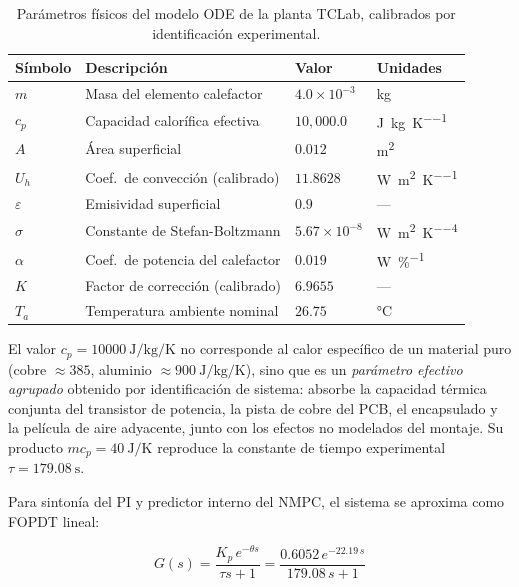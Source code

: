 \documentclass[processes,article,submit,moreauthors,pdftex]{Definitions/mdpi}
\begin{document}
\begin{table}[H]
\caption{Parámetros físicos del modelo ODE de la planta TCLab, calibrados
         por identificación experimental.}
\label{tab:params}
\begin{tabular}{llll}
\toprule
\textbf{Símbolo} & \textbf{Descripción} & \textbf{Valor} & \textbf{Unidades} \\
\midrule
$m$           & Masa del elemento calefactor      & $4.0\times10^{-3}$  & \si{\kg} \\
$c_p$         & Capacidad calorífica efectiva     & $10{,}000.0$        & \si{\J\per\kg\per\K} \\
$A$           & Área superficial                  & $0.012$             & \si{\m\squared} \\
$U_h$         & Coef.\ de convección (calibrado)  & $11.8628$           & \si{\W\per\m\squared\per\K} \\
$\varepsilon$ & Emisividad superficial            & $0.9$               & --- \\
$\sigma$      & Constante de Stefan-Boltzmann     & $5.67\times10^{-8}$ & \si{\W\per\m\squared\per\K\tothe{4}} \\
$\alpha$      & Coef.\ de potencia del calefactor & $0.019$             & \si{\W\per\percent} \\
$K$           & Factor de corrección (calibrado)  & $6.9655$            & --- \\
$T_a$         & Temperatura ambiente nominal      & $26.75$             & \si{\celsius} \\
\bottomrule
\end{tabular}
\end{table}

El valor $c_p = \SI{10000}{\J\per\kg\per\K}$
no corresponde al calor específico de un material puro (cobre
$\approx 385$, aluminio $\approx \SI{900}{\J\per\kg\per\K}$), sino que es un
\emph{parámetro efectivo agrupado} obtenido por identificación de sistema:
absorbe la capacidad térmica conjunta del transistor de potencia, la pista
de cobre del PCB, el encapsulado y la película de aire adyacente, junto con
los efectos no modelados del montaje. Su producto $m c_p = \SI{40}{\J\per\K}$
reproduce la constante de tiempo experimental $\tau = \SI{179.08}{\second}$.

Para sintonía del PI y predictor interno del NMPC, el sistema se aproxima
como FOPDT lineal:

\begin{equation}
  \label{eq:fopdt}
  G(s) = \frac{K_p\, e^{-\theta s}}{\tau s + 1}
       = \frac{0.6052\, e^{-22.19\,s}}{179.08\,s + 1}
\end{equation}
\end{document}
